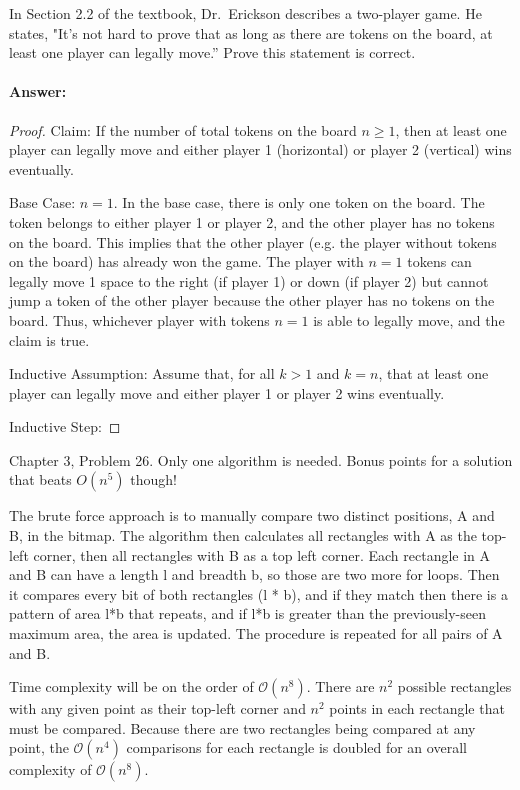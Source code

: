 \documentclass{article}
\begin{document}
In Section 2.2 of the textbook, Dr.~Erickson describes a two-player game.
He states, "It's not hard to prove that
as long as there are tokens on the board, at least one player can legally
move.''  Prove this statement is correct.

\paragraph{Answer:}
\begin{proof}
Claim: If the number of total tokens on the board $n \geq 1$, then at least one player can legally move and either player 1 (horizontal) or player 2 (vertical) wins eventually.

Base Case: $n = 1$. In the base case, there is only one token on the board. The token belongs to either player 1 or player 2, and the other player has no tokens on the board. This implies that the other player (e.g. the player without tokens on the board) has already won the game. The player with $n = 1$ tokens can legally move 1 space to the right (if player 1) or down (if player 2) but cannot jump a token of the other player because the other player has no tokens on the board. Thus, whichever player with tokens $n =1$ is able to legally move, and the claim is true.

Inductive Assumption: Assume that, for all $k > 1$ and $k = n$, that at least one player can legally move and either player 1 or player 2 wins eventually. 

Inductive Step: 
\end{proof}

\collab{\todo{}}

Chapter 3, Problem 26.  Only one algorithm is needed. Bonus points for a
solution that beats $O(n^5)$ though!

The brute force approach is to manually compare two distinct positions, A and B, in the bitmap. The algorithm then calculates all rectangles with A as the top-left corner, then all rectangles with B as a top left corner. Each rectangle in A and B can have a length l and breadth b, so those are two more for loops. Then it compares every bit of both rectangles (l * b), and if they match then there is a pattern of area l*b that repeats, and if l*b is greater than the previously-seen maximum area, the area is updated. The procedure is repeated for all pairs of A and B. 

Time complexity will be on the order of $\mathcal{O}(n^8)$. There are $n^2$ possible rectangles with any given point as their top-left corner and $n^2$ points in each rectangle that must be compared. Because there are two rectangles being compared at any point, the $\mathcal{O}(n^4)$ comparisons for each rectangle is doubled for an overall complexity of $\mathcal{O}(n^8).$
\end{document}
